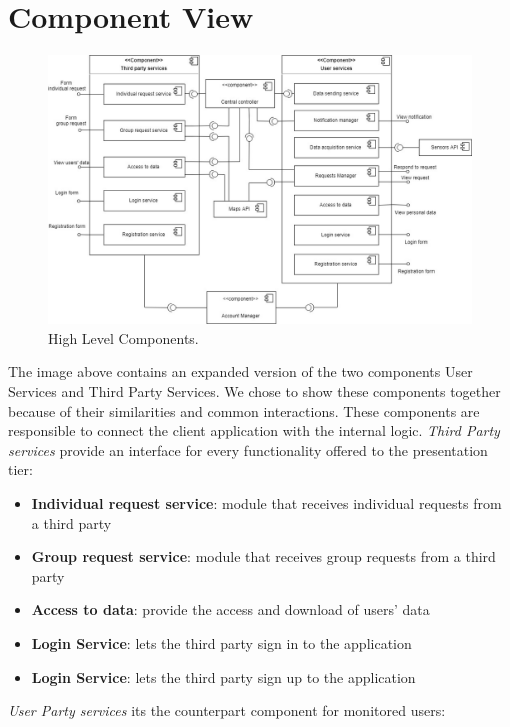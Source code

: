 \hypertarget{CV}{\section{Component	View}}
\begin{figure}[ht]
    \centering
    \includegraphics[width=345pt]{images/CompView/Component_view1.jpg}
    \caption{High Level Components.}
\end{figure}
The image above contains an expanded version of the two components User Services and Third Party Services.
We chose to show these components together because of their similarities and common interactions.
These components are responsible to connect the client application with the internal logic.
\textit{Third Party services} provide an interface for every functionality offered to the presentation tier:
\begin{itemize}
    \item \textbf{Individual request service}: module that receives individual requests from a third party \item \textbf{Group request service}: module that receives group requests from a third party
    \item \textbf{Access to data}: provide the access and download of users' data
    \item \textbf{Login Service}: lets the third party sign in to the application
    \item \textbf{Login Service}: lets the third party sign up to the application
\end{itemize}
\textit{User Party services} its the counterpart component for monitored users:
